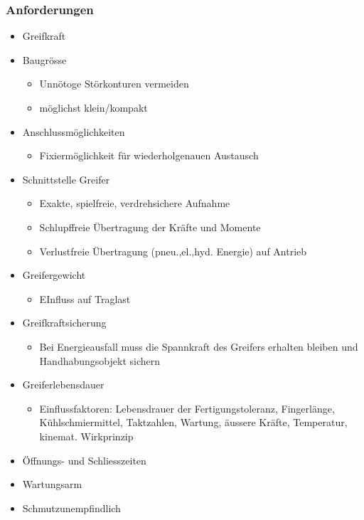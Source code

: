 \begin{minipage}{0.5\linewidth}
    \subsubsection{Anforderungen}
    \begin{itemize}
        \item Greifkraft
        \item Baugrösse
        \begin{itemize}
            \item Unnötoge Störkonturen vermeiden
            \item möglichst klein/kompakt
        \end{itemize}
        \item Anschlussmöglichkeiten
        \begin{itemize}
            \item Fixiermöglichkeit für wiederholgenauen Austausch
        \end{itemize}
        \item Schnittstelle Greifer
        \begin{itemize}
            \item Exakte, spielfreie, verdrehsichere Aufnahme
            \item Schlupffreie Übertragung der Kräfte und Momente
            \item Verlustfreie Übertragung (pneu.,el.,hyd. Energie) auf Antrieb
        \end{itemize}
        \item Greifergewicht
        \begin{itemize}
            \item EInfluss auf Traglast
        \end{itemize}
        \item Greifkraftsicherung
        \begin{itemize}
            \item Bei Energieausfall muss die Spannkraft des Greifers erhalten bleiben und Handhabungsobjekt sichern
        \end{itemize}
        \item Greiferlebensdauer
        \begin{itemize}
            \item Einflussfaktoren: Lebensdrauer der Fertigungstoleranz, Fingerlänge, Kühlschmiermittel, Taktzahlen, Wartung, äussere Kräfte, Temperatur, kinemat. Wirkprinzip
        \end{itemize}
        \item Öffnungs- und Schliesszeiten
        \item Wartungsarm
        \item Schmutzunempfindlich    
    \end{itemize}
\end{minipage}
